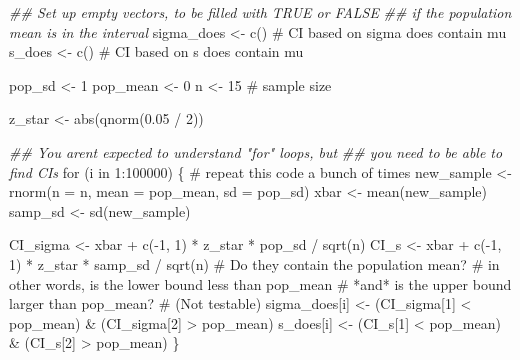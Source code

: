 \documentclass[
  letterpaper,
  DIV=11,
  numbers=noendperiod,
  oneside]{scrreprt}
\newenvironment{Shaded}{\begin{snugshade}}{\end{snugshade}}
\newcommand{\AttributeTok}[1]{\textcolor[rgb]{0.40,0.45,0.13}{#1}}
\newcommand{\CommentTok}[1]{\textcolor[rgb]{0.37,0.37,0.37}{#1}}
\newcommand{\ControlFlowTok}[1]{\textcolor[rgb]{0.00,0.23,0.31}{#1}}
\newcommand{\DecValTok}[1]{\textcolor[rgb]{0.68,0.00,0.00}{#1}}
\newcommand{\DocumentationTok}[1]{\textcolor[rgb]{0.37,0.37,0.37}{\textit{#1}}}
\newcommand{\FloatTok}[1]{\textcolor[rgb]{0.68,0.00,0.00}{#1}}
\newcommand{\FunctionTok}[1]{\textcolor[rgb]{0.28,0.35,0.67}{#1}}
\newcommand{\NormalTok}[1]{\textcolor[rgb]{0.00,0.23,0.31}{#1}}
\newcommand{\OtherTok}[1]{\textcolor[rgb]{0.00,0.23,0.31}{#1}}
\newcommand{\SpecialCharTok}[1]{\textcolor[rgb]{0.37,0.37,0.37}{#1}}
\begin{document}
\begin{Shaded}
\begin{Highlighting}[]
\DocumentationTok{\#\# Set up empty vectors, to be filled with TRUE or FALSE}
\DocumentationTok{\#\# if the population mean is in the interval}
\NormalTok{sigma\_does }\OtherTok{\textless{}{-}} \FunctionTok{c}\NormalTok{() }\CommentTok{\# CI based on sigma does contain mu}
\NormalTok{s\_does }\OtherTok{\textless{}{-}} \FunctionTok{c}\NormalTok{() }\CommentTok{\# CI based on s does contain mu}

\NormalTok{pop\_sd }\OtherTok{\textless{}{-}} \DecValTok{1}
\NormalTok{pop\_mean }\OtherTok{\textless{}{-}} \DecValTok{0}
\NormalTok{n }\OtherTok{\textless{}{-}} \DecValTok{15} \CommentTok{\# sample size}

\NormalTok{z\_star }\OtherTok{\textless{}{-}} \FunctionTok{abs}\NormalTok{(}\FunctionTok{qnorm}\NormalTok{(}\FloatTok{0.05} \SpecialCharTok{/} \DecValTok{2}\NormalTok{))}

\DocumentationTok{\#\# You aren\textquotesingle{}t expected to understand "for" loops, but}
\DocumentationTok{\#\# you need to be able to find CIs}
\ControlFlowTok{for}\NormalTok{ (i }\ControlFlowTok{in} \DecValTok{1}\SpecialCharTok{:}\DecValTok{100000}\NormalTok{) \{ }\CommentTok{\# repeat this code a bunch of times}
\NormalTok{    new\_sample }\OtherTok{\textless{}{-}} \FunctionTok{rnorm}\NormalTok{(}\AttributeTok{n =}\NormalTok{ n, }\AttributeTok{mean =}\NormalTok{ pop\_mean, }\AttributeTok{sd =}\NormalTok{ pop\_sd)}
\NormalTok{    xbar }\OtherTok{\textless{}{-}} \FunctionTok{mean}\NormalTok{(new\_sample)}
\NormalTok{    samp\_sd }\OtherTok{\textless{}{-}} \FunctionTok{sd}\NormalTok{(new\_sample)}

\NormalTok{    CI\_sigma }\OtherTok{\textless{}{-}}\NormalTok{ xbar }\SpecialCharTok{+} \FunctionTok{c}\NormalTok{(}\SpecialCharTok{{-}}\DecValTok{1}\NormalTok{, }\DecValTok{1}\NormalTok{) }\SpecialCharTok{*}\NormalTok{ z\_star }\SpecialCharTok{*}\NormalTok{ pop\_sd }\SpecialCharTok{/} \FunctionTok{sqrt}\NormalTok{(n)}
\NormalTok{    CI\_s }\OtherTok{\textless{}{-}}\NormalTok{ xbar }\SpecialCharTok{+} \FunctionTok{c}\NormalTok{(}\SpecialCharTok{{-}}\DecValTok{1}\NormalTok{, }\DecValTok{1}\NormalTok{) }\SpecialCharTok{*}\NormalTok{ z\_star }\SpecialCharTok{*}\NormalTok{ samp\_sd }\SpecialCharTok{/} \FunctionTok{sqrt}\NormalTok{(n)}
    \CommentTok{\# Do they contain the population mean?}
    \CommentTok{\# in other words, is the lower bound less than pop\_mean}
    \CommentTok{\# *and* is the upper bound larger than pop\_mean?}
    \CommentTok{\# (Not testable)}
\NormalTok{    sigma\_does[i] }\OtherTok{\textless{}{-}}\NormalTok{ (CI\_sigma[}\DecValTok{1}\NormalTok{] }\SpecialCharTok{\textless{}}\NormalTok{ pop\_mean) }\SpecialCharTok{\&}\NormalTok{ (CI\_sigma[}\DecValTok{2}\NormalTok{] }\SpecialCharTok{\textgreater{}}\NormalTok{ pop\_mean)}
\NormalTok{    s\_does[i] }\OtherTok{\textless{}{-}}\NormalTok{ (CI\_s[}\DecValTok{1}\NormalTok{] }\SpecialCharTok{\textless{}}\NormalTok{ pop\_mean) }\SpecialCharTok{\&}\NormalTok{ (CI\_s[}\DecValTok{2}\NormalTok{] }\SpecialCharTok{\textgreater{}}\NormalTok{ pop\_mean)}
\NormalTok{\}}


\end{Highlighting}
\end{Shaded}
\end{document}
